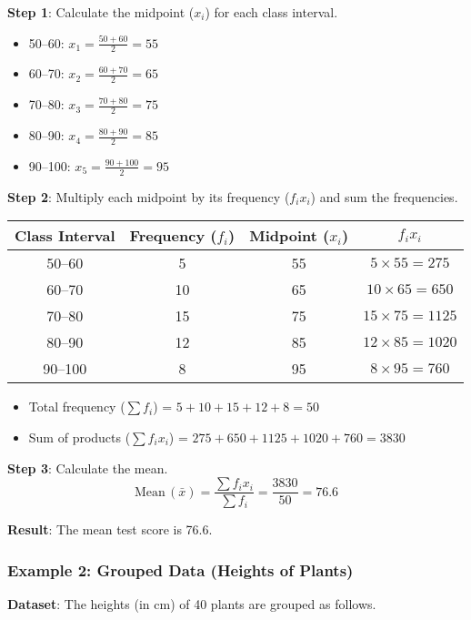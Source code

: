 \documentclass[11pt]{article}
\begin{document}
\textbf{Step 1}: Calculate the midpoint ($x_i$) for each class interval.
\begin{itemize}
    \item 50--60: $x_1 = \frac{50 + 60}{2} = 55$
    \item 60--70: $x_2 = \frac{60 + 70}{2} = 65$
    \item 70--80: $x_3 = \frac{70 + 80}{2} = 75$
    \item 80--90: $x_4 = \frac{80 + 90}{2} = 85$
    \item 90--100: $x_5 = \frac{90 + 100}{2} = 95$
\end{itemize}

\textbf{Step 2}: Multiply each midpoint by its frequency ($f_i x_i$) and sum the frequencies.

\begin{center}
\begin{tabular}{|c|c|c|c|}
\hline
\textbf{Class Interval} & \textbf{Frequency} ($f_i$) & \textbf{Midpoint} ($x_i$) & $f_i x_i$ \\
\hline
50--60 & 5 & 55 & $5 \times 55 = 275$ \\
60--70 & 10 & 65 & $10 \times 65 = 650$ \\
70--80 & 15 & 75 & $15 \times 75 = 1125$ \\
80--90 & 12 & 85 & $12 \times 85 = 1020$ \\
90--100 & 8 & 95 & $8 \times 95 = 760$ \\
\hline
\end{tabular}
\end{center}

\begin{itemize}
    \item Total frequency ($\sum f_i$) = $5 + 10 + 15 + 12 + 8 = 50$
    \item Sum of products ($\sum f_i x_i$) = $275 + 650 + 1125 + 1020 + 760 = 3830$
\end{itemize}

\textbf{Step 3}: Calculate the mean.
\[
\text{Mean} \, (\bar{x}) = \frac{\sum f_i x_i}{\sum f_i} = \frac{3830}{50} = 76.6
\]

\textbf{Result}: The mean test score is 76.6.

\subsubsection*{Example 2: Grouped Data (Heights of Plants)}
\textbf{Dataset}: The heights (in cm) of 40 plants are grouped as follows.
\end{document}
